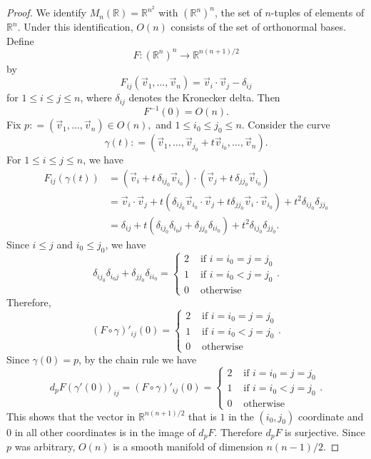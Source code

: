 \documentclass{ximera}
\begin{document}
\begin{proof}[Proof]
        We identify $M_n (\mathbb{R}) = \mathbb{R}^{n^2}$ with $(\mathbb{R}^n)^n$, the set of $n$-tuples of elements of $\mathbb{R}^n$. Under this identification, $O (n)$ consists of the set of orthonormal bases.  Define 
        \[    F :    (\mathbb{R}^n)^n \to \mathbb{R}^{n(n+1)/2}      \]
        by
        \[      F _{ij}(  \Vec{v}_1, \ldots,  \Vec{v}_n ) = \Vec{v}_i \cdot \Vec{v}_j - \delta _{ij}                 \]
        for $1\leq i \leq j\leq n$, where $\delta_{ij}$ denotes the Kronecker delta. Then
        \[        F^{-1} (0) = O (n) .                       \]
        Fix $  p : =  (\Vec{v}_1, \ldots , \Vec{v}_n) \in O (n) ,              $        and $1 \leq i_0 \leq j_0 \leq n$. Consider the curve 
        \[    \gamma ( t )  : = (  \Vec{v}_1 ,  \ldots , \Vec{v}_{j_0} + t \Vec{v}_{i_0} , \ldots , \Vec{v}_n )        .            \]
        For $1 \leq i \leq j \leq n$, we have
        \begin{align*}
           F _{ij } (\gamma (t))  & =  ( \Vec{v}_i + t \,\delta_{ij_0}  \Vec{v}_{i_0} ) \cdot ( \Vec{v}_j + t \, \delta_{jj_0} \Vec{v}_{i_0} ) \\                   & = \Vec{v}_i \cdot \Vec{v}_j + t ( \delta_{ij_0} \Vec{v}_{i_0} \cdot \Vec{v}_j + t \delta_{jj_0} \Vec{v}_i \cdot \Vec{v}_{i_0} ) + t^2 \delta_{ij_0} \delta_{jj_0} \\
           & = \delta_{ij} + t (\delta_{ij_0}\delta_{i_0j} + \delta_{jj_0}\delta_{ii_0}) + t^2 \delta_{ij_0} \delta_{jj_0}. 
        \end{align*}
        Since $i \leq j$ and $i_0 \leq j_0$, we have
        \[      \delta_{ij_0}\delta_{i_0j} + \delta_{jj_0}\delta_{ii_0} = \begin{cases}
            2 & \text{ if } i=i_0 =  j= j_0 \\
            1 & \text{ if } i=i_0 < j= j_0 \\
            0 & \text{ otherwise}
        \end{cases}        .            \]
        Therefore, 
        \[  (F \circ \gamma )'_{ij} (0) = \begin{cases}
            2 & \text{ if } i=i_0 =  j= j_0 \\
            1 & \text{ if } i=i_0 < j= j_0 \\
            0 & \text{ otherwise}
        \end{cases}              .                    \]
        Since $\gamma (0) = p$, by the chain rule we have 
        \[  d_p F (\gamma' (0)) _{ij} = (F \circ \gamma ) '_{ij} (0)  =   \begin{cases}
            2 & \text{ if } i=i_0 =  j= j_0 \\
            1 & \text{ if } i=i_0 < j= j_0 \\
            0 & \text{ otherwise}
        \end{cases}   .                           \]
        This shows that the vector in $\mathbb{R}^{n(n+1)/2}$ that is $1$ in the $(i_0, j_0)$ coordinate and $0$ in all other coordinates is in the image of $d_pF$. Therefore $d_pF $ is surjective. Since $p$ was arbitrary, $O (n) $ is a smooth manifold of dimension $n(n-1)/2$.
        
        \end{proof}
\end{document}
